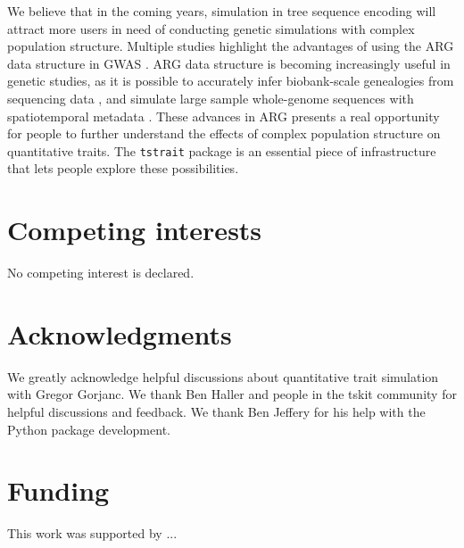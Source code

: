 \documentclass[unnumsec,webpdf,modern,large,namedate]{oup-authoring-template}%
\theoremstyle{thmstyleone}%
\theoremstyle{thmstyletwo}%
\theoremstyle{thmstylethree}%
\begin{document}
We believe that in the coming years, simulation in tree sequence encoding will attract more users in need of conducting genetic simulations with complex population structure. Multiple studies highlight the advantages of using the ARG data structure in GWAS \citep{link2023,salehi2023,zhang2023}. ARG data structure is becoming increasingly useful in genetic studies, as it is possible to accurately infer biobank-scale genealogies from sequencing data \citep{zhang2023}, and simulate large sample whole-genome sequences with spatiotemporal metadata \citep{anderson2023}. These advances in ARG presents a real opportunity for people to further understand the effects of complex population structure on quantitative traits. The \texttt{tstrait} package is an essential piece of infrastructure that lets people explore these possibilities.

\section{Competing interests}
No competing interest is declared.

\section{Acknowledgments}

We greatly acknowledge helpful discussions about quantitative trait simulation with Gregor Gorjanc. We thank Ben Haller and people in the tskit community for helpful discussions and feedback. We thank Ben Jeffery for his help with the Python package development.

\section{Funding}

This work was supported by ...




\end{document}

